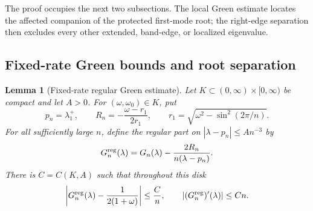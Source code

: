 \documentclass[twoside,10pt]{article}
\numberwithin{equation}{section}
\theoremstyle{slbody}
\newtheorem{lemma}[theorem]{Lemma}
\theoremstyle{definition}
\theoremstyle{remark}
\begin{document}
The proof occupies the next two subsections.  The local Green estimate
locates the affected companion of the protected first-mode root; the
right-edge separation then excludes every other extended, band-edge, or
localized eigenvalue.

\subsection{Fixed-rate Green bounds and root separation}

\begin{lemma}[Fixed-rate regular Green estimate]
\label{lem:fixed-regular-green}
Let $K\subset(0,\infty)\times[0,\infty)$ be compact and let $A>0$.
For $(\omega,\omega_0)\in K$, put
\[
 p_n=\lambda_1^+,
 \qquad
 R_n=-\frac{\omega-r_1}{2r_1},
 \qquad r_1=\sqrt{\omega^2-\sin^2(2\pi/n)}.
\]
For all sufficiently large $n$, define the regular part on
$|\lambda-p_n|\le A n^{-3}$ by
\[
 G_n^{\rm reg}(\lambda)
 =G_n(\lambda)-\frac{2R_n}{n(\lambda-p_n)}.
\]
There is $C=C(K,A)$ such that throughout this disk
\begin{equation}\label{eq:fixed-regular-green-bounds}
 \left|G_n^{\rm reg}(\lambda)-\frac1{2(1+\omega)}\right|
 \le \frac Cn,
 \qquad
 \left|(G_n^{\rm reg})'(\lambda)\right|\le Cn.
\end{equation}
\end{lemma}
\end{document}
